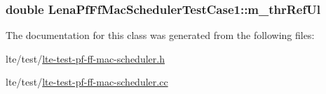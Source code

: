 \subsubsection[{\texorpdfstring{m\+\_\+thr\+Ref\+Ul}{m_thrRefUl}}]{\setlength{\rightskip}{0pt plus 5cm}double Lena\+Pf\+Ff\+Mac\+Scheduler\+Test\+Case1\+::m\+\_\+thr\+Ref\+Ul\hspace{0.3cm}{\ttfamily [private]}}\hypertarget{classLenaPfFfMacSchedulerTestCase1_a4a0d1aacb09837bc328ced85f024488b}{}\label{classLenaPfFfMacSchedulerTestCase1_a4a0d1aacb09837bc328ced85f024488b}


The documentation for this class was generated from the following files\+:\begin{DoxyCompactItemize}
\item 
lte/test/\hyperlink{lte-test-pf-ff-mac-scheduler_8h}{lte-\/test-\/pf-\/ff-\/mac-\/scheduler.\+h}\item 
lte/test/\hyperlink{lte-test-pf-ff-mac-scheduler_8cc}{lte-\/test-\/pf-\/ff-\/mac-\/scheduler.\+cc}\end{DoxyCompactItemize}
